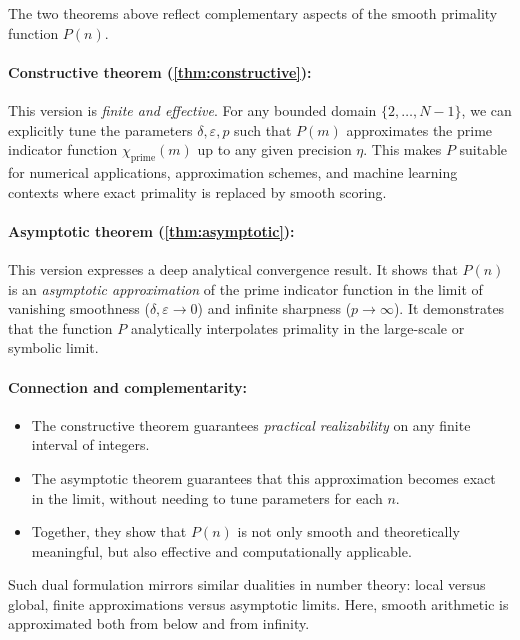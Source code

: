 \documentclass[12pt]{article}
\theoremstyle{definition}
\theoremstyle{plain}
\theoremstyle{remark}
\begin{document}
The two theorems above reflect complementary aspects of the smooth primality function \( P(n) \).

\paragraph{Constructive theorem (\ref{thm:constructive}):}

This version is \emph{finite and effective}. For any bounded domain \( \{2, \dots, N-1\} \), we can explicitly tune the parameters \( \delta, \varepsilon, p \) such that \( P(m) \) approximates the prime indicator function \( \chi_{\mathrm{prime}}(m) \) up to any given precision \( \eta \). This makes \( P \) suitable for numerical applications, approximation schemes, and machine learning contexts where exact primality is replaced by smooth scoring.

\paragraph{Asymptotic theorem (\ref{thm:asymptotic}):}

This version expresses a deep analytical convergence result. It shows that \( P(n) \) is an \emph{asymptotic approximation} of the prime indicator function in the limit of vanishing smoothness (\( \delta, \varepsilon \to 0 \)) and infinite sharpness (\( p \to \infty \)). It demonstrates that the function \( P \) analytically interpolates primality in the large-scale or symbolic limit.

\paragraph{Connection and complementarity:}

\begin{itemize}
  \item The constructive theorem guarantees \emph{practical realizability} on any finite interval of integers.
  \item The asymptotic theorem guarantees that this approximation becomes exact in the limit, without needing to tune parameters for each \( n \).
  \item Together, they show that \( P(n) \) is not only smooth and theoretically meaningful, but also effective and computationally applicable.
\end{itemize}

Such dual formulation mirrors similar dualities in number theory: local versus global, finite approximations versus asymptotic limits. Here, smooth arithmetic is approximated both from below and from infinity.
\end{document}
